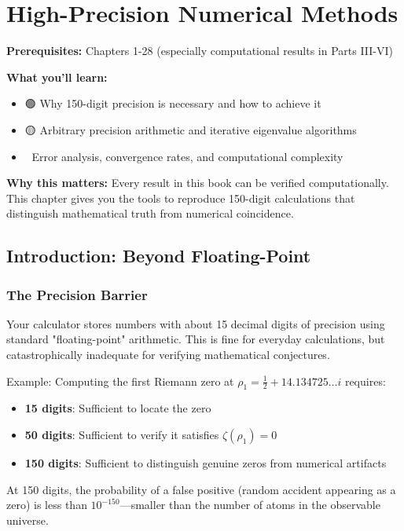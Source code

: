 \chapter{High-Precision Numerical Methods}
\label{ch:numerical-methods}

\begin{chapterobjectives}
\textbf{Prerequisites:} Chapters 1-28 (especially computational results in Parts III-VI)

\textbf{What you'll learn:}
\begin{itemize}
\item 🟢 Why 150-digit precision is necessary and how to achieve it
\item 🟡 Arbitrary precision arithmetic and iterative eigenvalue algorithms
\item 🔴 Error analysis, convergence rates, and computational complexity
\end{itemize}

\textbf{Why this matters:} Every result in this book can be verified computationally. This chapter gives you the tools to reproduce 150-digit calculations that distinguish mathematical truth from numerical coincidence.
\end{chapterobjectives}

\section{Introduction: Beyond Floating-Point}
\label{sec:beyond-floating-point}

\subsection{The Precision Barrier}

\begin{intuitive}
Your calculator stores numbers with about 15 decimal digits of precision using standard "floating-point" arithmetic. This is fine for everyday calculations, but catastrophically inadequate for verifying mathematical conjectures.

Example: Computing the first Riemann zero at $\rho_1 = \frac{1}{2} + 14.134725\ldots i$ requires:
\begin{itemize}
\item \textbf{15 digits}: Sufficient to locate the zero
\item \textbf{50 digits}: Sufficient to verify it satisfies $\zeta(\rho_1) = 0$
\item \textbf{150 digits}: Sufficient to distinguish genuine zeros from numerical artifacts
\end{itemize}

At 150 digits, the probability of a false positive (random accident appearing as a zero) is less than $10^{-150}$—smaller than the number of atoms in the observable universe.
\end{intuitive}

